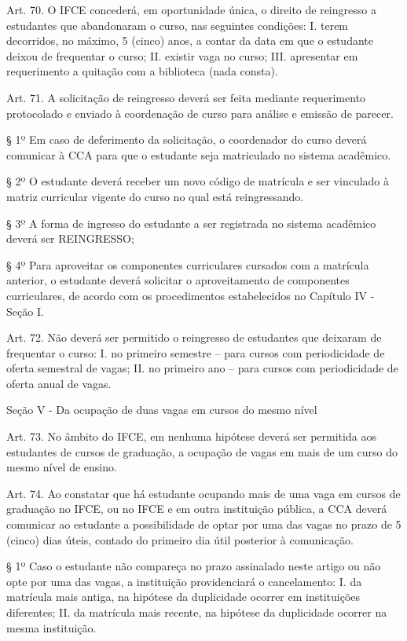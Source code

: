 {Art. 70. O IFCE concederá, em oportunidade única, o direito de reingresso a estudantes que abandonaram o curso, nas seguintes condições:
I. terem decorridos, no máximo, 5 (cinco) anos, a contar da data em que o estudante deixou de frequentar o curso;
II. existir vaga no curso;
III. apresentar em requerimento a quitação com a biblioteca (nada consta).

Art. 71. A solicitação de reingresso deverá ser feita mediante requerimento protocolado e enviado à coordenação de curso para análise e emissão de parecer.

§ 1º Em caso de deferimento da solicitação, o coordenador do curso deverá comunicar à CCA para que o estudante seja matriculado no sistema acadêmico.

§ 2º O estudante deverá receber um novo código de matrícula e ser vinculado à matriz curricular vigente do curso no qual está reingressando.

§ 3º A forma de ingresso do estudante a ser registrada no sistema acadêmico deverá ser REINGRESSO;

§ 4º Para aproveitar os componentes curriculares cursados com a matrícula anterior, o estudante deverá solicitar o aproveitamento de componentes curriculares, de acordo com os procedimentos estabelecidos no Capítulo IV - Seção I.

Art. 72. Não deverá ser permitido o reingresso de estudantes que deixaram de frequentar o curso:
I. no primeiro semestre – para cursos com periodicidade de oferta semestral de vagas;
II. no primeiro ano – para cursos com periodicidade de oferta anual de vagas.

\begin{center}
	Seção V - Da ocupação de duas vagas em cursos do mesmo nível
\end{center}   

Art. 73. No âmbito do IFCE, em nenhuma hipótese deverá ser permitida aos estudantes de cursos de graduação, a ocupação de vagas em mais de um curso do mesmo nível de ensino.

Art. 74. Ao constatar que há estudante ocupando mais de uma vaga em cursos de graduação no IFCE, ou no IFCE e em outra instituição pública, a CCA deverá comunicar ao estudante a possibilidade de optar por uma das vagas no prazo de 5 (cinco) dias úteis, contado do primeiro dia útil posterior à comunicação.

§ 1º Caso o estudante não compareça no prazo assinalado neste artigo ou não opte por uma das vagas, a instituição providenciará o cancelamento:
I. da matrícula mais antiga, na hipótese da duplicidade ocorrer em instituições diferentes;
II. da matrícula mais recente, na hipótese da duplicidade ocorrer na mesma instituição.

}
